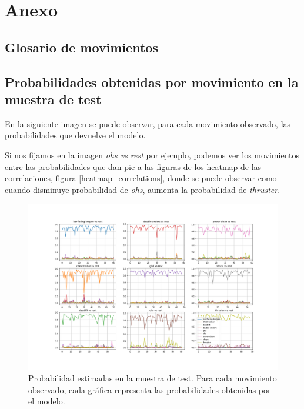 \chapter{Anexo}

\section{Glosario de movimientos}



\section{Probabilidades obtenidas por movimiento en la muestra de test}\label{Probabilidades}

En la siguiente imagen se puede observar, para cada movimiento observado, las probabilidades que devuelve el modelo.

Si nos fijamos en la imagen \textit{ohs vs rest} por ejemplo, podemos ver los movimientos entre las probabilidades que dan pie a las figuras de los heatmap de las correlaciones, figura \ref{heatmap_correlations}, donde se puede observar como cuando disminuye probabilidad de \textit{ohs}, aumenta la probabilidad de \textit{thruster}.

\begin{figure}[H]
    \centering
		\includegraphics[width=\textwidth]{figs/probabilities_by_movement.png}
\caption{Probabilidad estimadas en la muestra de test. Para cada movimiento observado, cada gráfica representa las probabilidades obtenidas por el modelo.}\label{probabilities_by_movement}
\end{figure}



